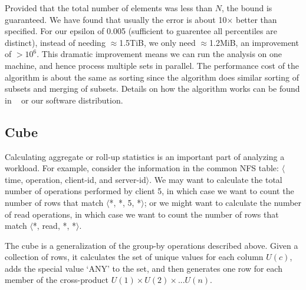 Provided that the total number of elements
was less than $N$, the bound is guaranteed.  We have found that
usually the error is about 10$\times$ better than specified.  For our
epsilon of 0.005 (sufficient to guarentee all percentiles are
distinct), instead of needing $\approx$1.5TiB, we only need
$\approx$1.2MiB, an improvement of $>10^6$.  This dramatic improvement
means we can run the analysis on one machine, and hence process
multiple sets in parallel.  The performance cost of the algorithm is
about the same as sorting since the algorithm does similar sorting of
subsets and merging of subsets.  Details on how the algorithm works
can be found in ~\cite{Manku98approximatemedians} or our software
distribution.


\subsection{Cube}

Calculating aggregate or roll-up statistics is an important part of
analyzing a workload.  For example, consider the information in the
common NFS table: $\langle$time, operation, client-id, and
server-id$\rangle$.  We may want to calculate the total number of
operations performed by client 5, in which case we want to count the
number of rows that match $\langle$*, *, 5, *$\rangle$; or we might
want to calculate the number of read operations, in which case we want
to count the number of rows that match $\langle$*, read, *,
*$\rangle$.

The cube\cite{gray97cube} is a generalization of the group-by
operations described above.  Given a collection of rows, it calculates
the set of unique values for each column $U(c)$, adds the special
value `ANY' to the set, and then generates one row for each member of
the cross-product $U(1) \times U(2) \times ... U(n)$.

